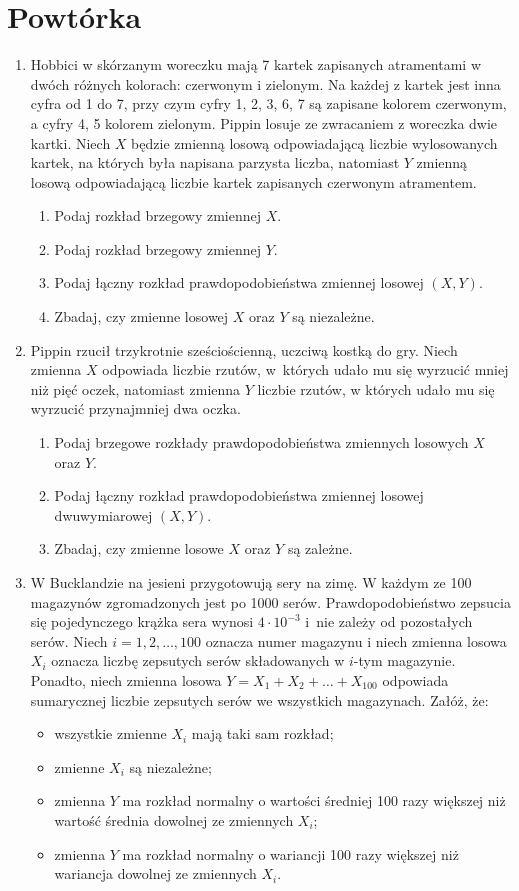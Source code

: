 \documentclass{mwart}
\begin{document}
\section{Powtórka}
\begin{enumerate}
\item Hobbici w skórzanym woreczku mają 7 kartek zapisanych atramentami w dwóch różnych kolorach: czerwonym i zielonym.
Na każdej z kartek jest inna cyfra od 1 do 7, przy czym cyfry 1, 2, 3, 6, 7 są zapisane kolorem czerwonym, a cyfry 4, 5 kolorem zielonym.
Pippin losuje ze zwracaniem z woreczka dwie kartki.
Niech $X$ będzie zmienną losową odpowiadającą liczbie wylosowanych kartek, na których była napisana parzysta liczba, natomiast $Y$ zmienną losową odpowiadającą liczbie kartek zapisanych czerwonym atramentem.
\begin{enumerate}
\item Podaj rozkład brzegowy zmiennej $X$.
\item Podaj rozkład brzegowy zmiennej $Y$.
\item Podaj łączny rozkład prawdopodobieństwa zmiennej losowej $(X,Y)$.
\item Zbadaj, czy zmienne losowej $X$ oraz $Y$ są niezależne.
\end{enumerate}
\item Pippin rzucił trzykrotnie sześciościenną, uczciwą kostką do gry. Niech zmienna $X$ odpowiada liczbie rzutów, w~których udało mu się wyrzucić mniej niż pięć
oczek, natomiast zmienna $Y$ liczbie rzutów, w których udało mu się wyrzucić przynajmniej dwa oczka.
\begin{enumerate}
\item Podaj brzegowe rozkłady prawdopodobieństwa zmiennych losowych $X$ oraz $Y$.
\item Podaj łączny rozkład prawdopodobieństwa zmiennej losowej dwuwymiarowej $(X,Y)$.
\item Zbadaj, czy zmienne losowe $X$ oraz $Y$ są zależne.
\end{enumerate}
\item W Bucklandzie na jesieni przygotowują sery na zimę. W każdym ze 100 magazynów
zgromadzonych jest po 1000 serów. Prawdopodobieństwo zepsucia się pojedynczego
krążka sera wynosi $4\cdot 10^{-3}$ i~nie zależy od pozostałych serów. Niech
$i=1,2,\ldots,100$ oznacza numer magazynu i niech zmienna losowa $X_i$ oznacza
liczbę zepsutych serów składowanych w $i$-tym magazynie. Ponadto, niech zmienna
losowa $Y=X_1+X_2+\ldots+X_{100}$ odpowiada sumarycznej liczbie zepsutych serów
we wszystkich magazynach. Załóż, że:
\begin{itemize}
\item wszystkie zmienne $X_i$ mają taki sam rozkład;
\item zmienne $X_i$ są niezależne;
\item zmienna $Y$ ma rozkład normalny o wartości średniej 100 razy większej niż wartość średnia dowolnej ze zmiennych $X_i$;
\item zmienna $Y$ ma rozkład normalny o wariancji 100 razy większej niż wariancja dowolnej ze zmiennych $X_i$.
\end{itemize}


\end{enumerate}
\end{document}
